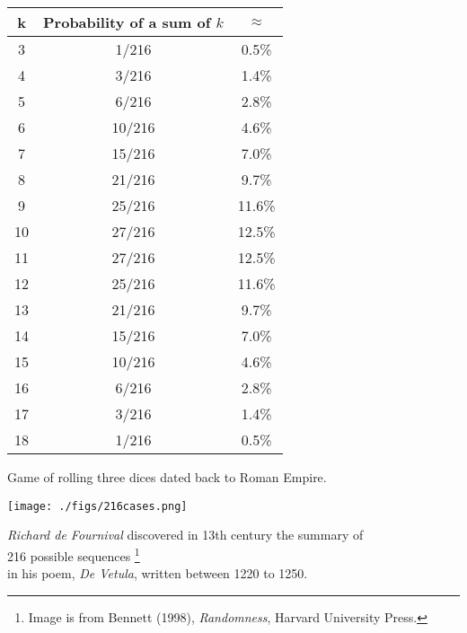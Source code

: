 \documentclass[9pt,xcolor=dvipsnames,table]{beamer}
\begin{document}
\begin{frame}[fragile,t] %

  \begin{center}
  \renewcommand{\arraystretch}{1.2}
  \begin{tabular}{|c|c|c|} \hline
    k  & Probability of a sum of $k$ & $\approx$ \\ \hline
    3  & 1/216                       & 0.5\%     \\
    4  & 3/216                       & 1.4\%     \\
    5  & 6/216                       & 2.8\%     \\
    6  & 10/216                      & 4.6\%     \\
    7  & 15/216                      & 7.0\%     \\
    8  & 21/216                      & 9.7\%     \\
    9  & 25/216                      & 11.6\%    \\
    10 & 27/216                      & 12.5\%    \\
    11 & 27/216                      & 12.5\%    \\
    12 & 25/216                      & 11.6\%    \\
    13 & 21/216                      & 9.7\%     \\
    14 & 15/216                      & 7.0\%     \\
    15 & 10/216                      & 4.6\%     \\
    16 & 6/216                       & 2.8\%     \\
    17 & 3/216                       & 1.4\%     \\
    18 & 1/216                       & 0.5\%     \\ \hline
  \end{tabular}

  \end{center}
\end{frame}
\begin{frame}[fragile,t] %

 \begin{center}
   Game of rolling three dices dated back to Roman Empire.
   \bigskip
   \bigskip

   \texttt{[image: ./figs/216cases.png]}
   \bigskip

   {\it Richard de Fournival} discovered in 13th century the summary of                                        \\
   216 possible sequences \footnote{Image is from Bennett (1998), {\it Randomness}, Harvard University Press.} \\
   in his poem, \textit{\it De Vetula}, written between 1220 to 1250.


 \end{center}
\end{frame}
\end{document}
